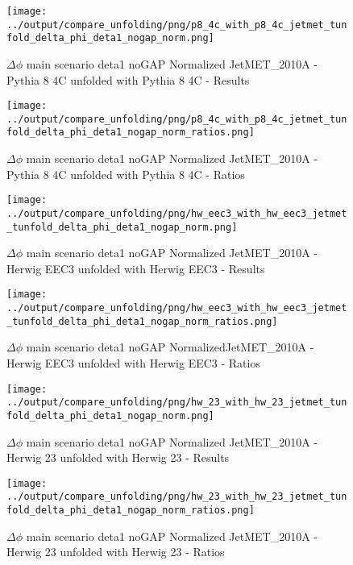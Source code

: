 \documentclass[11pt]{book}
\begin{document}
\begin{figure}[ht]
\centering
\texttt{[image: ../output/compare\_unfolding/png/p8\_4c\_with\_p8\_4c\_jetmet\_tunfold\_delta\_phi\_deta1\_nogap\_norm.png]}
\caption{$\Delta\phi$ main scenario deta1 noGAP Normalized JetMET\_2010A - Pythia 8 4C unfolded with Pythia 8 4C - Results}
\label{p8_p8_jetmet_tunfold_delta_phi_deta1_nogap_norm_a}
\end{figure}

\begin{figure}[ht]
\centering
\texttt{[image: ../output/compare\_unfolding/png/p8\_4c\_with\_p8\_4c\_jetmet\_tunfold\_delta\_phi\_deta1\_nogap\_norm\_ratios.png]}
\caption{$\Delta\phi$ main scenario deta1 noGAP Normalized JetMET\_2010A - Pythia 8 4C unfolded with Pythia 8 4C - Ratios}
\label{p8_p8_jetmet_tunfold_delta_phi_deta1_nogap_norm_b}
\end{figure}

\begin{figure}[ht]
\centering
\texttt{[image: ../output/compare\_unfolding/png/hw\_eec3\_with\_hw\_eec3\_jetmet\_tunfold\_delta\_phi\_deta1\_nogap\_norm.png]}
\caption{$\Delta\phi$ main scenario deta1 noGAP Normalized JetMET\_2010A - Herwig EEC3 unfolded with Herwig EEC3 - Results}
\label{hw_eec3_hw_eec3_jetmet_tunfold_delta_phi_deta1_nogap_norm_a}
\end{figure}

\begin{figure}[ht]
\centering
\texttt{[image: ../output/compare\_unfolding/png/hw\_eec3\_with\_hw\_eec3\_jetmet\_tunfold\_delta\_phi\_deta1\_nogap\_norm\_ratios.png]}
\caption{$\Delta\phi$ main scenario deta1 noGAP NormalizedJetMET\_2010A - Herwig EEC3 unfolded with Herwig EEC3 - Ratios}
\label{hw_eec3_hw_eec3_jetmet_tunfold_delta_phi_deta1_nogap_norm_b}
\end{figure}

\begin{figure}[ht]
\centering
\texttt{[image: ../output/compare\_unfolding/png/hw\_23\_with\_hw\_23\_jetmet\_tunfold\_delta\_phi\_deta1\_nogap\_norm.png]}
\caption{$\Delta\phi$ main scenario deta1 noGAP Normalized JetMET\_2010A - Herwig 23 unfolded with Herwig 23 - Results}
\label{hw_23_hw_23_jetmet_tunfold_delta_phi_deta1_nogap_norm_a}
\end{figure}

\begin{figure}[ht]
\centering
\texttt{[image: ../output/compare\_unfolding/png/hw\_23\_with\_hw\_23\_jetmet\_tunfold\_delta\_phi\_deta1\_nogap\_norm\_ratios.png]}
\caption{$\Delta\phi$ main scenario deta1 noGAP Normalized JetMET\_2010A - Herwig 23 unfolded with Herwig 23 - Ratios}
\label{hw_23_hw_23_jetmet_tunfold_delta_phi_deta1_nogap_norm_b}
\end{figure}
\end{document}
